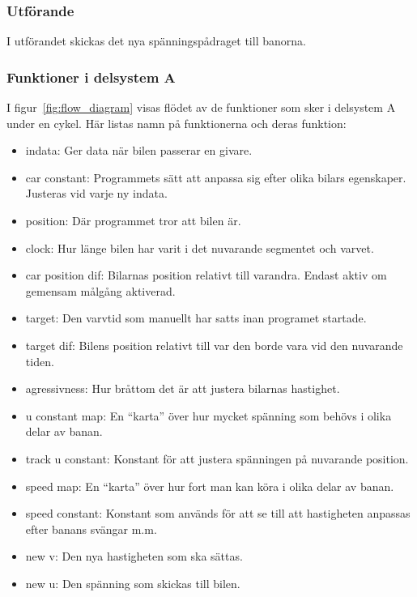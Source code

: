     \subsubsection{Utförande}

    	I utförandet skickas det nya spänningspådraget till banorna. 
	

    \subsubsection{Funktioner i delsystem A}
	I figur~\ref{fig:flow_diagram}  visas flödet av de funktioner som sker i delsystem A under en cykel.
	Här listas namn på funktionerna och deras funktion:
	\begin{itemize}
 		\item indata: Ger data när bilen passerar en givare.
		\item car constant: Programmets sätt att anpassa sig efter olika bilars egenskaper. Justeras vid varje ny indata.
 		\item position: Där programmet tror att bilen är.
 		\item clock: Hur länge bilen har varit i det nuvarande segmentet och varvet.
		\item car position dif: Bilarnas position relativt till varandra. Endast aktiv om gemensam målgång aktiverad.
		\item target: Den varvtid som manuellt har satts inan programet startade.
		\item target dif: Bilens position relativt till var den borde vara vid den nuvarande tiden.
		\item agressivness: Hur bråttom det är att justera bilarnas hastighet.
		\item u constant map: En ``karta'' över hur mycket spänning som behövs i olika delar av banan.
		\item track u constant: Konstant för att justera spänningen på nuvarande position.
		\item speed map: En ``karta'' över hur fort man kan köra i olika delar av banan.
		\item speed constant: Konstant som används för att se till att hastigheten anpassas efter banans svängar m.m.
		\item new v: Den nya hastigheten som ska sättas.
		\item new u: Den spänning som skickas till bilen.
	\end{itemize}

